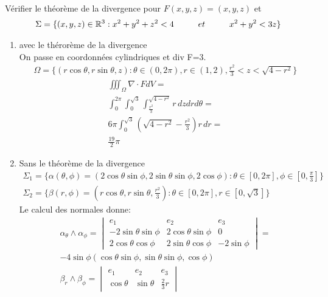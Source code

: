 \begin{myExample}
	Vérifier le théorème de la divergence pour $F(x,y,z)=(x,y,z)$ et 
	\begin{eqnarray*}
		\Sigma=\{(x,y,z)\in\R^3:x^2+y^2+z^2<4\hspace{10 mm}et\hspace{10 mm}x^2+y^2<3z\}
	\end{eqnarray*}
	\begin{enumerate}
		\item avec le thérorème de la divergence
			\\On passe en coordonnées cylindriques et div F=3.
			\begin{eqnarray*}
				\Omega=\{(r\cos\theta,r\sin\theta,z):\theta\in(0,2\pi),r\in(1,2),\frac{r^2}{3}<z<\sqrt{4-r^2}\}
			\end{eqnarray*}
			\begin{eqnarray*}
				\iiint_\Omega \nabla\cdot FdV=
				\\
				\int_0^{2\pi}\int_0^{\sqrt{3}}\int_{\frac{r^2}{3}}^{\sqrt{4-r^2}}r\,dzdrd\theta=
				\\
				6\pi\int_0^{\sqrt{3}}(\sqrt{4-r^2}-\frac{r^2}{3})r\,dr=
				\\
				\frac{19}{2}\pi
			\end{eqnarray*}
		\item Sans le théorème de la divergence
			\begin{eqnarray*}
				\Sigma_1=\{\alpha(\theta,\phi)=(2\cos\theta\sin\phi,2\sin\theta\sin\phi,2\cos\phi):\theta\in[0,2\pi],\phi\in[0,\frac{\pi}{3}]\}
				\\
				\Sigma_2=\{\beta(r,\phi)=(r\cos\theta,r\sin\theta,\frac{r^2}{3}):\theta\in[0,2\pi],r\in[0,\sqrt{3}]\}
			\end{eqnarray*}
			Le calcul des normales donne:
			\begin{eqnarray*}
				\alpha_\theta\wedge\alpha_\phi=
				\begin{vmatrix}
					e_1&e_2&e_3
					\\
					-2\sin\theta\sin\phi&2\cos\theta\sin\phi&0
					\\
					2\cos\theta\cos\phi&2\sin\theta\cos\phi&-2\sin\phi
				\end{vmatrix}=
				\\
				-4\sin\phi(\cos\theta\sin\phi,\sin\theta\sin\phi,\cos\phi)
				\\
				\beta_r\wedge\beta_\phi=
				\begin{vmatrix}
					e_1&e_2&e_3
					\\
					\cos\theta&\sin\theta&\frac{2}{3}r

\end{vmatrix}
\end{eqnarray*}
\end{enumerate}
\end{myExample}
